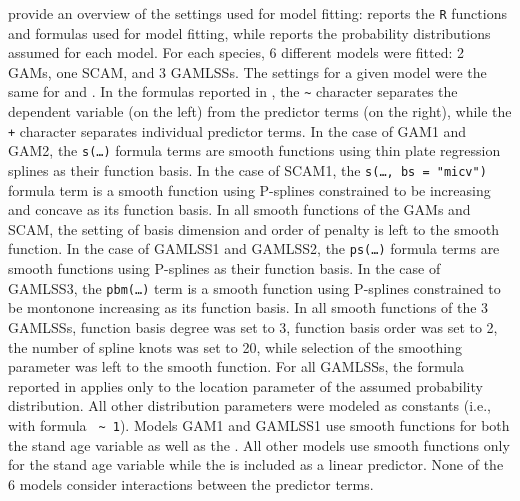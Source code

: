  provide an overview of the settings used for model fitting:   reports the \texttt{R} functions and formulas used for model fitting, while  reports the probability distributions assumed for each model.  For each species, 6 different models were fitted: 2 GAMs, one SCAM, and 3 GAMLSSs.  The settings for a given model were the same for \Beech{} and \Spruce{}.
In the formulas reported in , the \texttt{\textasciitilde{}} character separates the dependent variable (on the left) from the predictor terms (on the right), while the \texttt{+} character separates individual predictor terms. 
In the case of GAM1 and GAM2, the \texttt{s(\textnormal{\ldots})} formula terms are smooth functions using thin plate regression splines as their function basis.  In the case of SCAM1, the \texttt{s(\textnormal{\ldots{}}, bs = "micv")} formula term is a smooth function using P-splines constrained to be increasing and concave as its function basis.  In all smooth functions of the GAMs and SCAM, the setting of basis dimension and order of penalty is left to the smooth function.  In the case of GAMLSS1 and GAMLSS2, the \texttt{ps(\textnormal{\ldots})} formula terms are smooth functions using P-splines as their function basis.  In the case of GAMLSS3, the \texttt{pbm(\textnormal{\ldots{}})} term is a smooth function using P-splines constrained to be montonone increasing as its function basis.  In all smooth functions of the 3 GAMLSSs, function basis degree was set to 3, function basis order was set to 2, the number of spline knots was set to 20, while selection of the smoothing parameter was left to the smooth function. For all GAMLSSs, the formula reported in  applies only to the location parameter of the assumed probability distribution. All other distribution parameters were modeled as constants (i.e., with formula \texttt{\BasalAreaR{} \textasciitilde{} 1}).  Models GAM1 and GAMLSS1 use smooth functions for both the stand age variable as well as the \ProductivityIndexVariableText{}.  All other models use smooth functions only for the stand age variable while the \ProductivityIndexVariableText{} is included as a linear predictor.  None of the 6 models consider interactions between the predictor terms.

